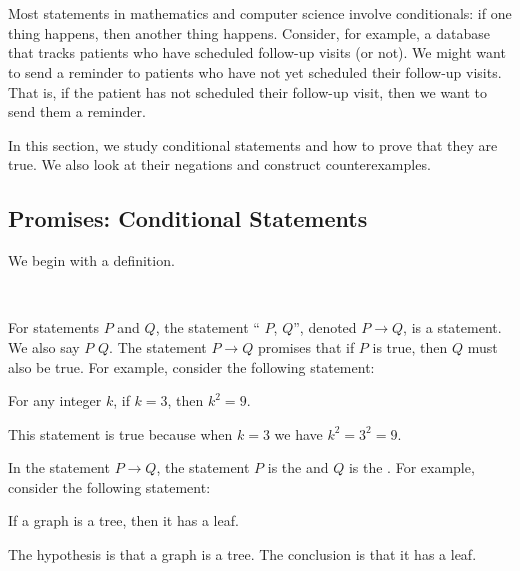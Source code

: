 \section{\secifthen}
\label{sec_conditional_statements}

Most statements in mathematics and computer science involve conditionals:  if one thing happens, then another thing happens.  Consider, for example, a database that tracks patients who have scheduled follow-up visits (or not).  We might want to send a reminder to patients who have not yet scheduled their follow-up visits.  That is, if the patient has not scheduled their follow-up visit, then we want to send them a reminder.

In this section, we study conditional statements and how to prove that they are true. We also look at their negations and construct counterexamples.  

\newcommand{\subifthen}{Promises: Conditional Statements}
\subsection{\subifthen}
\label{sub_if_then}

We begin with a definition.

\begin{defn}
\label{defn_conditional}
~
    \begin{apart}
        \item For statements $P$ and $Q$, the statement `` $P$,  $Q$'', denoted $P \to Q$, is a  statement. We also say $P$  $Q$.
        The statement $P \to Q$ promises that if $P$ is true, then $Q$ must also be true.  For example, consider the following statement:       
            \begin{center}
                For any integer $k$, if $k=3$, then $k^2=9$.
            \end{center}
        This statement is true because when $k=3$ we have $k^2 = 3^2 = 9$.  
        \item In the statement $P \to Q$, the statement $P$ is the  and $Q$ is the .  For example, consider the following statement:
            \begin{center}
                If a graph is a tree, then it has a leaf.
            \end{center}
        The hypothesis is that a graph is a tree.  The conclusion is that it has a leaf.
    \end{apart} 
\end{defn}

